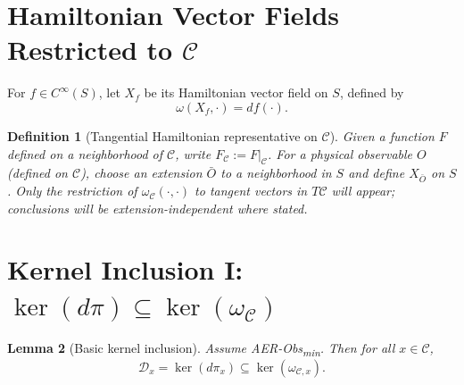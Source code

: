 \documentclass[11pt]{article}
\newtheorem{definition}{Definition}[section]
\newtheorem{lemma}[definition]{Lemma}
\theoremstyle{remark}
\theoremstyle{plain}
\begin{document}
\section{Hamiltonian Vector Fields Restricted to \texorpdfstring{$\mathcal{C}$}{C}}

For $f\in C^\infty(S)$, let $X_f$ be its Hamiltonian vector field on $S$, defined by
\begin{equation}
\omega(X_f,\cdot)=df(\cdot).
\end{equation}

\begin{definition}[Tangential Hamiltonian representative on $\mathcal{C}$]
Given a function $F$ defined on a neighborhood of $\mathcal{C}$, write $F_{\mathcal{C}}:=F|_{\mathcal{C}}$.
For a physical observable $O$ (defined on $\mathcal{C}$), choose an extension $\bar O$ to a neighborhood in $S$ and define $X_{\bar O}$ on $S$.
Only the restriction of $\omega_{\mathcal{C}}(\cdot,\cdot)$ to tangent vectors in $T\mathcal{C}$ will appear; conclusions will be extension-independent where stated.
\end{definition}

\section{Kernel Inclusion I: \texorpdfstring{$\ker(d\pi)\subseteq\ker(\omega_{\mathcal{C}})$}{ker(dpi) subset ker(omegaC)}}

\begin{lemma}[Basic kernel inclusion]
\label{lem:incl1}
Assume AER-Obs\textsubscript{min}. Then for all $x\in\mathcal{C}$,
\begin{equation}
\mathcal{D}_x=\ker(d\pi_x)\subseteq \ker(\omega_{\mathcal{C},x}).
\end{equation}
\end{lemma}
\end{document}
